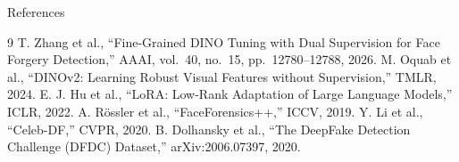 \documentclass[aspectratio=169,10pt]{beamer}
\begin{document}
\begin{frame}{References}
\footnotesize
\begin{thebibliography}{9}
 T. Zhang et al., ``Fine-Grained DINO Tuning with Dual Supervision for Face Forgery Detection,'' AAAI, vol.~40, no.~15, pp.~12780--12788, 2026.
 M. Oquab et al., ``DINOv2: Learning Robust Visual Features without Supervision,'' TMLR, 2024.
 E. J. Hu et al., ``LoRA: Low-Rank Adaptation of Large Language Models,'' ICLR, 2022.
 A. R\"ossler et al., ``FaceForensics++,'' ICCV, 2019.
 Y. Li et al., ``Celeb-DF,'' CVPR, 2020.
 B. Dolhansky et al., ``The DeepFake Detection Challenge (DFDC) Dataset,'' arXiv:2006.07397, 2020.
\end{thebibliography}
\end{frame}
\end{document}
